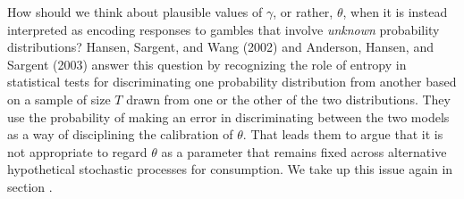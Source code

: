   How should we think
about plausible values of $\gamma$, or rather,  $\theta$,  when it is instead
interpreted as encoding responses to gambles that involve {\it unknown\/}
probability distributions?  Hansen, Sargent, and Wang (2002) and Anderson, Hansen, and Sargent (2003) answer
this question by recognizing the role of entropy in statistical tests for discriminating one probability distribution from another based on a sample of size $T$ drawn from one or the
other of the two distributions.  They use the probability of making an error in discriminating between the two models as a way of disciplining the calibration of $\theta$.
That  leads  them to  argue
that it is not appropriate to regard $\theta$ as a
parameter that remains fixed across alternative hypothetical  stochastic
processes for consumption.
We take up this issue again in section .
%
%
%
%
%


